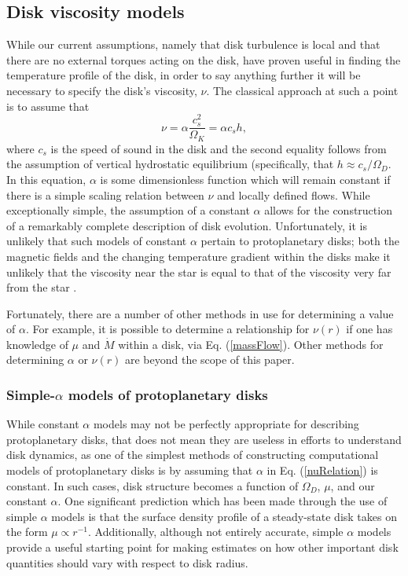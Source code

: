 \documentclass[aps,pra,twocolumn]{revtex4-1}
\begin{document}
\subsection{\label{section2.3} Disk viscosity models}
While our current assumptions, namely that disk turbulence is local and that there are no external torques acting on the disk, have proven useful in finding the temperature profile of the disk, in order to say anything further it will be necessary to specify the disk's viscosity, $\nu$.  The classical approach at such a point is to assume that
\begin{equation}
\nu = \alpha \frac{c_s^2}{\Omega_K} = \alpha c_s h , \label{nuRelation}
\end{equation}
where $c_s$ is the speed of sound in the disk and the second equality follows from the assumption of vertical hydrostatic equilibrium (specifically, that $h \approx c_s/\Omega_D$.  In this equation, $\alpha$ is some dimensionless function which will remain constant if there is a simple scaling relation between $\nu$ and locally defined flows.  While exceptionally simple, the assumption of a constant $\alpha$ allows for the construction of a remarkably complete description of disk evolution.  Unfortunately, it is unlikely that such models of constant $\alpha$ pertain to protoplanetary disks; both the magnetic fields and the changing temperature gradient within the disks make it unlikely that the viscosity near the star is equal to that of the viscosity very far from the star \cite{armitage2011}.

Fortunately, there are a number of other methods in use for determining a value of $\alpha$.  For example, it is possible to determine a relationship for $\nu(r)$ if one has knowledge of $\mu$ and $\dot{M}$ within a disk, via Eq. (\ref{massFlow}).  Other methods for determining $\alpha$ or $\nu(r)$ are beyond the scope of this paper.

\subsubsection{\label{section 2.3.1} Simple-$\alpha$ models of protoplanetary disks}
While constant $\alpha$ models may not be perfectly appropriate for describing protoplanetary disks, that does not mean they are useless in efforts to understand disk dynamics, as one of the simplest methods of constructing computational models of protoplanetary disks is by assuming that $\alpha$ in Eq. (\ref{nuRelation}) is constant.  In such cases, disk structure becomes a function of $\Omega_D$, $\mu$, and our constant $\alpha$.  One significant prediction which has been made through the use of simple $\alpha$ models is that the surface density profile of a steady-state disk takes on the form $\mu \propto r^{-1}$.  Additionally, although not entirely accurate, simple $\alpha$ models provide a useful starting point for making estimates on how other important disk quantities should vary with respect to disk radius.  
\end{document}
